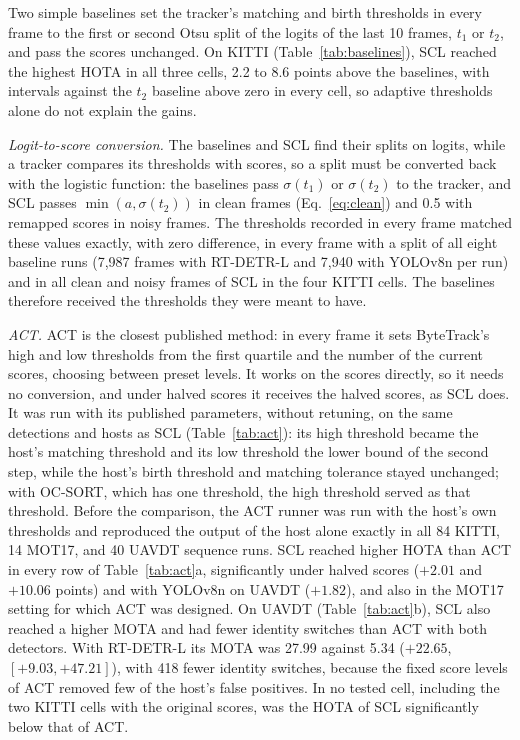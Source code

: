 \documentclass[pdflatex,sn-mathphys-num,iicol]{sn-jnl}
\makeatletter
\newcommand{\scl}{SCL}
\renewcommand\subsection{\@startsection{subsection}{2}{\z@}{-9pt \@plus -3pt \@minus -2pt}{4pt}{\subsectionfont}}
\makeatother
\begin{document}
\subsection{Comparison with Adaptive Thresholding Methods}\label{sec:baselines}
Two simple baselines set the tracker's matching and birth thresholds in every frame to the first or
second Otsu split of the logits of the last 10 frames, $t_1$ or $t_2$, and pass the scores
unchanged. On KITTI (Table~\ref{tab:baselines}), \scl{} reached the highest HOTA in all three
cells, 2.2 to 8.6 points above the baselines, with intervals against the $t_2$ baseline above zero
in every cell, so adaptive thresholds alone do not explain the gains.

\emph{Logit-to-score conversion.} The baselines and \scl{} find their splits on logits, while a
tracker compares its thresholds with scores, so a split must be converted back with the logistic
function: the baselines pass $\sigma(t_1)$ or $\sigma(t_2)$ to the tracker, and \scl{} passes
$\min(a,\sigma(t_2))$ in clean frames (Eq.~\eqref{eq:clean}) and 0.5 with remapped scores in noisy
frames. The thresholds recorded in every frame matched these values exactly, with zero difference,
in every frame with a split of all eight baseline runs (7,987 frames with RT-DETR-L and 7,940
with YOLOv8n per run) and in all clean and noisy frames of \scl{} in the four KITTI cells. The baselines therefore received the thresholds they were meant to have.

\emph{ACT.} ACT \cite{act2026adaptive} is the closest published method: in every frame it sets
ByteTrack's high and low thresholds from the first quartile and the number of the current scores,
choosing between preset levels. It works on the scores directly, so it needs no conversion, and
under halved scores it receives the halved scores, as \scl{} does. It was run with its published
parameters, without retuning, on the same detections and hosts as \scl{} (Table~\ref{tab:act}):
its high threshold became the host's matching threshold and its low threshold the lower bound of
the second step, while the host's birth threshold and matching tolerance stayed unchanged; with
OC-SORT, which has one threshold, the high threshold served as that threshold. Before the
comparison, the ACT runner was run with the host's own thresholds and reproduced the output of the
host alone exactly in all 84 KITTI, 14 MOT17, and 40 UAVDT sequence runs. \scl{} reached higher HOTA
than ACT in every row of Table~\ref{tab:act}a, significantly under halved
scores ($+2.01$ and $+10.06$ points) and with YOLOv8n on UAVDT ($+1.82$), and also in the MOT17
setting for which ACT was designed. On UAVDT (Table~\ref{tab:act}b), \scl{} also reached a higher
MOTA and had fewer identity switches than ACT with both detectors. With RT-DETR-L its MOTA was 27.99
against 5.34 ($+22.65$, $[+9.03,+47.21]$), with 418 fewer identity switches, because the fixed score
levels of ACT removed few of the host's false positives. In no tested cell, including the two KITTI cells with the
original scores, was the HOTA of \scl{} significantly below that of ACT.
\end{document}
